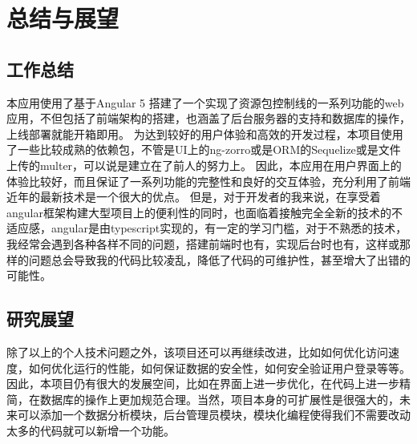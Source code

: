 
\chapter{总结与展望}
\section{工作总结}
本应用使用了基于Angular 5 搭建了一个实现了资源包控制线的一系列功能的web应用，不但包括了前端架构的搭建，也涵盖了后台服务器的支持和数据库的操作，上线部署就能开箱即用。
	为达到较好的用户体验和高效的开发过程，本项目使用了一些比较成熟的依赖包，不管是UI上的ng-zorro或是ORM的Sequelize或是文件上传的multer，可以说是建立在了前人的努力上。
	因此，本应用在用户界面上的体验比较好，而且保证了一系列功能的完整性和良好的交互体验，充分利用了前端近年的最新技术是一个很大的优点。
	但是，对于开发者的我来说，在享受着angular框架构建大型项目上的便利性的同时，也面临着接触完全全新的技术的不适应感，angular是由typescript实现的，有一定的学习门槛，对于不熟悉的技术，
	我经常会遇到各种各样不同的问题，搭建前端时也有，实现后台时也有，这样或那样的问题总会导致我的代码比较凌乱，降低了代码的可维护性，甚至增大了出错的可能性。
\section{研究展望}
除了以上的个人技术问题之外，该项目还可以再继续改进，比如如何优化访问速度，如何优化运行的性能，如何保证数据的安全性，如何安全验证用户登录等等。
因此，本项目仍有很大的发展空间，比如在界面上进一步优化，在代码上进一步精简，在数据库的操作上更加规范合理。当然，项目本身的可扩展性是很强大的，未来可以添加一个数据分析模块，后台管理员模块，模块化编程使得我们不需要改动太多的代码就可以新增一个功能。
\clearpage
